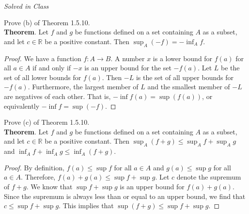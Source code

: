 \documentclass[12pt]{book}
\newenvironment{exercise}[2][Exercise]{\begin{trivlist}
\item[\hskip \labelsep {\bfseries #1}\hskip \labelsep {\bfseries #2.}]}{\end{trivlist}}
\begin{document}
\begin{exercise}{1.5.9}
\emph{Solved in Class}
\end{exercise}

\begin{exercise}{1.5.11}
Prove (b) of Theorem 1.5.10. \\

\textbf{Theorem}. Let $f$ and $g$ be functions defined on a set containing $A$ as a subset, and let $c \in \mathbb{R}$ be a positive constant. Then $\sup_A (-f) = - \inf_A f$.

	\begin{proof}
	We have a function $f: A \to B$. A number $x$ is a lower bound for $f(a)$ for all $a \in A$ if and only if $-x$ is an upper bound for the set $-f(a)$. Let  $L$ be the set of all lower bounds for $f(a)$. Then $-L$ is the set of all upper bounds for $-f(a)$. Furthermore, the largest member of $L$ and the smallest member of $-L$ are negatives of each other. That is, $- \inf f(a) = \sup (f(a))$, or equivalently $- \inf f = \sup (-f)$.  
	\end{proof}
\end{exercise}

\begin{exercise}{1.5.12}
Prove (c) of Theorem 1.5.10.\\

\textbf{Theorem}. Let $f$ and $g$ be functions defined on a set containing $A$ as a subset, and let $c \in \mathbb{R}$ be a positive constant. Then $\sup_A (f+g) \leq \sup_A f + \sup_A g $ and $\inf_A f + \inf_A g \leq \inf_A (f+g)$.

	\begin{proof}
	By definition, $f(a) \leq \sup f$ for all $a \in A$ and $g(a) \leq \sup g$ for all $a \in A$. Therefore, $f(a)+g(a) \leq \sup f + \sup g$. Let $c$ denote the supremum of $f+g$. We know that $\sup f + \sup g$ is an upper bound  for $f(a)+g(a)$. Since the supremum is always less than or equal to an upper bound, we find that $c \leq \sup f + \sup g$. This implies that $\sup (f+g) \leq \sup f + \sup g$.
	\end{proof}
\end{exercise}
\end{document}
